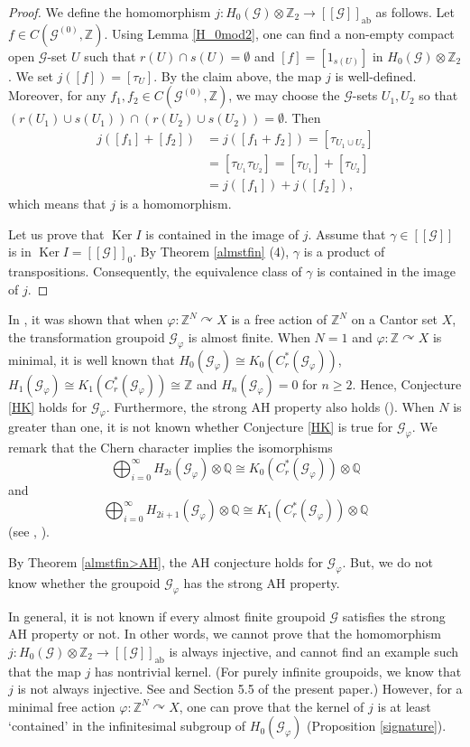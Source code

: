 \documentclass[11pt]{article}
\theoremstyle{definition}
\numberwithin{equation}{section}
\renewcommand{\phi}{\varphi}
\newcommand{\Ker}{\operatorname{Ker}}
\newcommand{\ab}{\mathrm{ab}}
\newcommand{\G}{\mathcal{G}}
\newcommand{\Z}{\mathbb{Z}}
\newcommand{\Q}{\mathbb{Q}}
\begin{document}
\begin{proof}
We define 
the homomorphism $j:H_0(\G)\otimes\Z_2\to[[\G]]_\ab$ as follows. 
Let $f\in C(\G^{(0)},\Z)$. 
Using Lemma \ref{H_0mod2}, 
one can find a non-empty compact open $\G$-set $U$ 
such that $r(U)\cap s(U)=\emptyset$ and 
$[f]=[1_{s(U)}]$ in $H_0(\G)\otimes\Z_2$. 
We set $j([f])=[\tau_U]$. 
By the claim above, the map $j$ is well-defined. 
Moreover, for any $f_1,f_2\in C(\G^{(0)},\Z)$, 
we may choose the $\G$-sets $U_1,U_2$ 
so that $(r(U_1)\cup s(U_1))\cap(r(U_2)\cup s(U_2))=\emptyset$. 
Then 
\begin{align*}
j([f_1]+[f_2])&=j([f_1+f_2])=[\tau_{U_1\cup U_2}]\\
&=[\tau_{U_1}\tau_{U_2}]=[\tau_{U_1}]+[\tau_{U_2}]\\
&=j([f_1])+j([f_2]), 
\end{align*}
which means that $j$ is a homomorphism. 

Let us prove that $\Ker I$ is contained in the image of $j$. 
Assume that $\gamma\in[[\G]]$ is in $\Ker I=[[\G]]_0$. 
By Theorem \ref{almstfin} (4), 
$\gamma$ is a product of transpositions. 
Consequently, 
the equivalence class of $\gamma$ is contained in the image of $j$. 
\end{proof}

In \cite[Lemma 6.3]{M12PLMS}, 
it was shown that 
when $\phi:\Z^N\curvearrowright X$ is a free action of $\Z^N$ 
on a Cantor set $X$, 
the transformation groupoid $\G_\phi$ is almost finite. 
When $N=1$ and $\phi:\Z\curvearrowright X$ is minimal, 
it is well known that 
$H_0(\G_\phi)\cong K_0(C^*_r(\G_\phi))$, 
$H_1(\G_\phi)\cong K_1(C^*_r(\G_\phi))\cong\Z$ 
and $H_n(\G_\phi)=0$ for $n\geq2$. 
Hence, Conjecture \ref{HK} holds for $\G_\phi$. 
Furthermore, the strong AH property also holds 
(\cite[Theorem 4.8]{M06IJM}). 
When $N$ is greater than one, 
it is not known whether Conjecture \ref{HK} is true for $\G_\phi$. 
We remark that the Chern character implies the isomorphisms 
\[
\bigoplus_{i=0}^\infty H_{2i}(\G_\phi)\otimes\Q
\cong K_0(C^*_r(\G_\phi))\otimes\Q
\]
and 
\[
\bigoplus_{i=0}^\infty H_{2i+1}(\G_\phi)\otimes\Q
\cong K_1(C^*_r(\G_\phi))\otimes\Q
\]
(see \cite[Section 4]{FH99ETDS}, \cite[Section 3.1]{M12PLMS}). 

By Theorem \ref{almstfin>AH}, 
the AH conjecture holds for $\G_\phi$. 
But, we do not know 
whether the groupoid $\G_\phi$ has the strong AH property. 

In general, it is not known 
if every almost finite groupoid $\G$ satisfies the strong AH property or not. 
In other words, we cannot prove that 
the homomorphism $j:H_0(\G)\otimes\Z_2\to[[\G]]_\ab$ is always injective, 
and cannot find an example such that the map $j$ has nontrivial kernel. 
(For purely infinite groupoids, we know that $j$ is not always injective. 
See \cite[Example 7.1]{Ne15} and Section 5.5 of the present paper.) 
However, for a minimal free action $\phi:\Z^N\curvearrowright X$, 
one can prove that the kernel of $j$ is at least `contained' 
in the infinitesimal subgroup of $H_0(\G_\phi)$ 
(Proposition \ref{signature}). 
\end{document}
